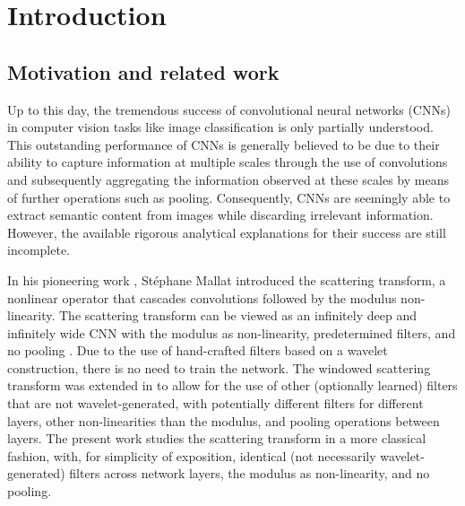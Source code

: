 \documentclass[11pt]{amsart}
\newenvironment{proof sketch} {\textit{Proof sketch.}}{}
\begin{document}
  \section{Introduction}
  
  \subsection{Motivation and related work}\label{sec: Motivation and related work}
  
  Up to this day, the tremendous success of convolutional neural networks (CNNs) in computer vision tasks \cite{zhao2024review} like image classification is only partially understood. This outstanding performance of CNNs is generally believed to be due to their ability to capture information at multiple scales through the use of convolutions and subsequently aggregating the information observed at these scales by means of further operations such as pooling. Consequently, CNNs are seemingly able to extract semantic content from images while discarding irrelevant information. However, the available rigorous analytical explanations for their success are still incomplete.
  
  In his pioneering work \cite{mallat2012group}, Stéphane Mallat introduced the 
  scattering transform, a nonlinear operator that cascades convolutions followed by the modulus non-linearity. The scattering transform can be viewed as an infinitely deep and infinitely wide CNN with the modulus as non-linearity, predetermined filters, and no pooling \cite{wiatowski2017mathematical}. Due to the use of hand-crafted filters based on a wavelet construction, there is no need to train the network. The windowed scattering transform was extended in \cite{wiatowski2017mathematical} to allow for the use of other (optionally learned) filters that are not wavelet-generated, with potentially different filters for different layers, other non-linearities than the modulus, and pooling operations between layers. The present work studies the scattering transform in a more classical fashion, with, for simplicity of exposition, identical (not necessarily wavelet-generated) filters across network layers, the modulus as non-linearity, and no pooling. 
  
\end{document}
